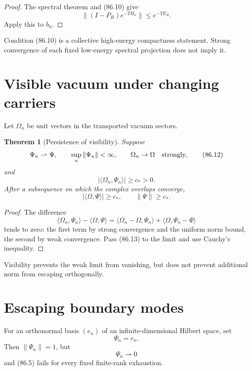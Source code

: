 \documentclass[11pt]{article}
\newtheorem{theorem}{Theorem}[section]
\theoremstyle{remark}
\begin{document}
\begin{proof}
The spectral theorem and (86.10) give
\[
 \|(I-P_R)e^{-TH_n}\|\leq e^{-TE_R}.
\]
Apply this to \(b_n\).
\end{proof}

Condition (86.10) is a collective high-energy compactness
statement.  Strong convergence of each fixed low-energy spectral
projection does not imply it.

\section{Visible vacuum under changing carriers}

Let \(\Omega_n\) be unit vectors in the transported vacuum sectors.

\begin{theorem}[Persistence of visibility]
\label{thm:v15v86-visible}
Suppose
\[
 \Psi_n\rightharpoonup\Psi,\qquad
 \sup_n\|\Psi_n\|<\infty,\qquad
 \Omega_n\to\Omega\quad\hbox{strongly},                \tag{86.12}
\]
and
\[
 |\langle\Omega_n,\Psi_n\rangle|\geq c_*>0.           \tag{86.13}
\]
After a subsequence on which the complex overlaps converge,
\[
 |\langle\Omega,\Psi\rangle|\geq c_*,
 \qquad
 \|\Psi\|\geq c_*.                                    \tag{86.14}
\]
\end{theorem}

\begin{proof}
The difference
\[
 \langle\Omega_n,\Psi_n\rangle-\langle\Omega,\Psi\rangle
 =
 \langle\Omega_n-\Omega,\Psi_n\rangle
 +\langle\Omega,\Psi_n-\Psi\rangle
\]
tends to zero: the first term by strong convergence and the uniform
norm bound, the second by weak convergence.  Pass (86.13) to the
limit and use Cauchy's inequality.
\end{proof}

Visibility prevents the weak limit from vanishing, but does not
prevent additional norm from escaping orthogonally.

\section{Escaping boundary modes}

\begin{counterexample}
\label{cnt:v15v86-escape}
For an orthonormal basis \((e_n)\) of an infinite-dimensional
Hilbert space, set
\[
 \Psi_n=e_n.                                          \tag{86.15}
\]
Then \(\|\Psi_n\|=1\), but
\[
 \Psi_n\rightharpoonup0
\]
and (86.5) fails for every fixed finite-rank exhaustion.
\end{counterexample}
\end{document}
